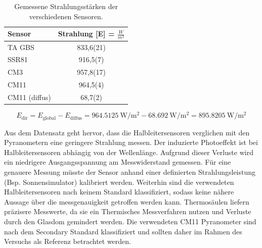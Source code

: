 \begin{table}[H]
	\centering
	\caption{Gemessene Strahlungsstärken der verschiedenen Sensoren.}
\begin{tabular}{l S[separate-uncertainty,table-parse-only,table-figures-uncertainty = 1]}
	\textbf{Sensor} & \textbf{Strahlung [E] = $\frac{W}{m^2}$}\\
	\hline
		TA GBS & 833,6(21)\\
		SSR81 & 916,5(7)\\
		CM3 & 957,8(17)\\
		CM11 & 964,5(4)\\
		CM11 (diffus) & 68,7(2)
\end{tabular} 

	\label{tab:radiation}
\end{table}

\begin{equation}
	\label{eq:Edir}
	E_{\text{dir}}=E_{\text{global}}-E_{\text{diffus}}=\SI{964.5125}{\watt\per\square\meter}-\SI{68.692}{\watt\per\square\meter} = \SI{895.8205}{\watt\per\square\meter}
\end{equation}

Aus dem Datensatz geht hervor, dass die Halbleitersensoren verglichen mit den Pyranometern eine geringere Strahlung messen. Der induzierte Photoeffekt ist bei Halbleitersensoren abhängig von der Wellenlänge. Aufgrund dieser Verluste wird ein niedrigere Ausgangsspannung am Messwiderstand gemessen. Für eine genauere Messung müsste der Sensor anhand einer definierten Strahlungsleistung (Bsp. Sonnensimulator) kalibriert werden. Weiterhin sind die verwendeten Halbleitersensoren nach keinem Standard klassifiziert, sodass keine nähere Aussage über die messgenauigkeit getroffen werden kann. Thermosäulen liefern präzisere Messwerte, da sie ein Thermisches Messverfahren nutzen und Verluste durch den Glasdom gemindert werden. Die verwendeten CM11 Pyranometer sind nach dem Secondary Standard klassifiziert und sollten daher im Rahmen des Versuchs als Referenz betrachtet werden.


